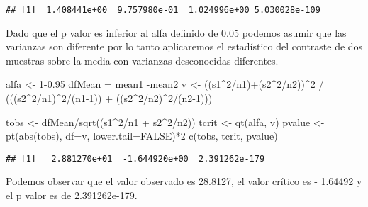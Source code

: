 \documentclass[
  a4paper]{article}
\newenvironment{Shaded}{\begin{snugshade}}{\end{snugshade}}
\newcommand{\AttributeTok}[1]{\textcolor[rgb]{0.77,0.63,0.00}{#1}}
\newcommand{\ConstantTok}[1]{\textcolor[rgb]{0.00,0.00,0.00}{#1}}
\newcommand{\DecValTok}[1]{\textcolor[rgb]{0.00,0.00,0.81}{#1}}
\newcommand{\FloatTok}[1]{\textcolor[rgb]{0.00,0.00,0.81}{#1}}
\newcommand{\FunctionTok}[1]{\textcolor[rgb]{0.00,0.00,0.00}{#1}}
\newcommand{\NormalTok}[1]{#1}
\newcommand{\OtherTok}[1]{\textcolor[rgb]{0.56,0.35,0.01}{#1}}
\newcommand{\SpecialCharTok}[1]{\textcolor[rgb]{0.00,0.00,0.00}{#1}}
\begin{document}
\begin{verbatim}
## [1]  1.408441e+00  9.757980e-01  1.024996e+00 5.030028e-109
\end{verbatim}

Dado que el p valor es inferior al alfa definido de 0.05 podemos asumir
que las varianzas son diferente por lo tanto aplicaremos el estadístico
del contraste de dos muestras sobre la media con varianzas desconocidas
diferentes.

\begin{Shaded}
\begin{Highlighting}[]
\NormalTok{alfa }\OtherTok{\textless{}{-}} \DecValTok{1}\FloatTok{{-}0.95}
\NormalTok{dfMean }\OtherTok{=}\NormalTok{ mean1 }\SpecialCharTok{{-}}\NormalTok{mean2}
\NormalTok{v }\OtherTok{\textless{}{-}}\NormalTok{ ((s1}\SpecialCharTok{\^{}}\DecValTok{2}\SpecialCharTok{/}\NormalTok{n1)}\SpecialCharTok{+}\NormalTok{(s2}\SpecialCharTok{\^{}}\DecValTok{2}\SpecialCharTok{/}\NormalTok{n2))}\SpecialCharTok{\^{}}\DecValTok{2} \SpecialCharTok{/}\NormalTok{ (((s2}\SpecialCharTok{\^{}}\DecValTok{2}\SpecialCharTok{/}\NormalTok{n1)}\SpecialCharTok{\^{}}\DecValTok{2}\SpecialCharTok{/}\NormalTok{(n1}\DecValTok{{-}1}\NormalTok{)) }\SpecialCharTok{+}\NormalTok{ ((s2}\SpecialCharTok{\^{}}\DecValTok{2}\SpecialCharTok{/}\NormalTok{n2)}\SpecialCharTok{\^{}}\DecValTok{2}\SpecialCharTok{/}\NormalTok{(n2}\DecValTok{{-}1}\NormalTok{)))}

\NormalTok{tobs }\OtherTok{\textless{}{-}}\NormalTok{ dfMean}\SpecialCharTok{/}\FunctionTok{sqrt}\NormalTok{((s1}\SpecialCharTok{\^{}}\DecValTok{2}\SpecialCharTok{/}\NormalTok{n1 }\SpecialCharTok{+}\NormalTok{ s2}\SpecialCharTok{\^{}}\DecValTok{2}\SpecialCharTok{/}\NormalTok{n2))}
\NormalTok{tcrit }\OtherTok{\textless{}{-}} \FunctionTok{qt}\NormalTok{(alfa, v)}
\NormalTok{pvalue }\OtherTok{\textless{}{-}} \FunctionTok{pt}\NormalTok{(}\FunctionTok{abs}\NormalTok{(tobs), }\AttributeTok{df=}\NormalTok{v, }\AttributeTok{lower.tail=}\ConstantTok{FALSE}\NormalTok{)}\SpecialCharTok{*}\DecValTok{2}
\FunctionTok{c}\NormalTok{(tobs, tcrit, pvalue)}
\end{Highlighting}
\end{Shaded}

\begin{verbatim}
## [1]   2.881270e+01  -1.644920e+00  2.391262e-179
\end{verbatim}

Podemos observar que el valor observado es 28.8127, el valor crítico es
- 1.64492 y el p valor es de 2.391262e-179.
\end{document}
